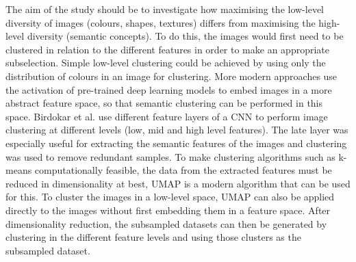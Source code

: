 The aim of the study should be to investigate how maximising the low-level diversity of images (colours, shapes, textures) differs from maximising the high-level diversity (semantic concepts). To do this, the images would first need to be clustered in relation to the different features in order to make an appropriate subselection. Simple low-level clustering could be achieved by using only the distribution of colours in an image for clustering\cite{maheshwariImageClusteringUsing2009}. More modern approaches use the activation of pre-trained deep learning models to embed images in a more abstract feature space, so that semantic clustering can be performed in this space\cite{chang2017deep}. Birdokar et al.\cite{birodkarSemanticRedundanciesImageClassification2019} use different feature layers of a CNN to perform image clustering at different levels (low, mid and high level features). The late layer was especially useful for extracting the semantic features of the images and clustering was used to remove redundant samples. To make clustering algorithms such as k-means computationally feasible, the data from the extracted features must be reduced in dimensionality at best, UMAP\cite{mcinnesUMAPUniformManifold2018} is a modern algorithm that can be used for this. To cluster the images in a low-level space, UMAP can also be applied directly to the images without first embedding them in a feature space. After dimensionality reduction, the subsampled datasets can then be generated by clustering in the different feature levels and using those clusters as the subsampled dataset.



